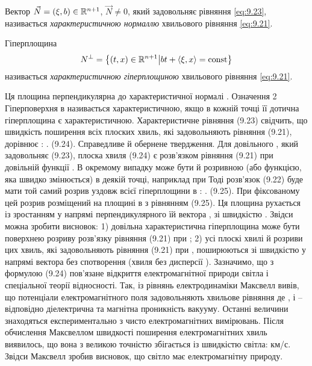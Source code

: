 \begin{definition}
    Вектор $\vec N = (\xi, b) \in \mathbb{R}^{n + 1}$, $\vec N \ne 0$, який задовольняє рівняння \eqref{eq:9.23}, називається \textit{характеристичною нормаллю} хвильового рівняння \eqref{eq:9.21}.
\end{definition}

\begin{definition}
    Гіперплощина
    \begin{equation}
        N^\perp = \left\{(t, x) \in \RR^{n + 1} \middle| b t + \langle \xi, x \rangle = \const \right\}
    \end{equation}
    називається \textit{характеристичною гіперплощиною} хвильового рівняння \eqref{eq:9.21}.
\end{definition}
 
Ця площина перпендикулярна до характеристичної нормалі  .
Означення 2 Гіперповерхня в   називається характеристичною, якщо в кожній точці її дотична гіперплощина є характеристичною.
Характеристичне рівняння (9.23) свідчить, що швидкість поширення всіх плоских хвиль, які задовольняють рівняння (9.21), дорівнює  :
 .                                  (9.24).
Справедливе й обернене твердження. Для довільного  , який задовольняє (9.23), плоска хвиля (9.24) є розв’язком рівняння (9.21) при довільній функції  . 
В окремому випадку   може бути й розривною (або функцією, яка швидко змінюється) в деякій точці, наприклад при   Тоді розв’язок (9.22) буде мати той самий розрив уздовж всієї гіперплощини в  :
 .                                  (9.25).
При фіксованому   цей розрив розміщений на площині в   з рівнянням (9.25). Ця площина рухається із зростанням   у напрямі перпендикулярного їй вектора  , зі швидкістю  .
Звідси можна зробити висновок:
1) довільна характеристична гіперплощина може бути поверхнею розриву розв’язку рівняння (9.21) при  ;
2) усі плоскі хвилі й розриви цих хвиль, які задовольняють рівняння (9.21) при  , поширюються зі швидкістю   у напрямі вектора   без спотворення (хвиля без дисперсії ).
Зазначимо, що з формулою (9.24) пов’язане відкриття електромагнітної природи світла і спеціальної теорії відносності. Так, із рівнянь електродинаміки Максвелл вивів, що потенціали електромагнітного поля задовольняють хвильове рівняння   де  ,   і   – відповідно діелектрична та магнітна проникність вакууму. Останні величини знаходяться експериментально з чисто електромагнітних вимірювань. Після обчислення Максвеллом швидкості поширення електромагнітних хвиль виявилось, що вона з великою точністю збігається із швидкістю світла:   км/с. Звідси Максвелл зробив висновок, що світло має електромагнітну природу.
